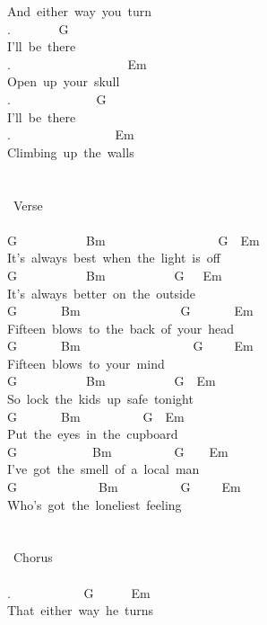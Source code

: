 {And\ either\ way\ you\ turn\\
. \ \ \ \ \ \ \ G\\
I'll\ be\ there\\
. \ \ \ \ \ \ \ \ \ \ \ \ \ \ \ \ \ \ Em\\
Open\ up\ your\ skull\\
. \ \ \ \ \ \ \ \ \ \ \ \ \ G\\
I'll\ be\ there\\
. \ \ \ \ \ \ \ \ \ \ \ \ \ \ \ \ Em\\
Climbing\ up\ the\ walls\\
\\
\\
\lbrack\ Verse\rbrack\\
\\
G\ \ \ \ \ \ \ \ \ \ \ Bm\ \ \ \ \ \ \ \ \ \ \ \ \ \ \ \ \ \ G\ \ Em\\
It's\ always\ best\ when\ the\ light\ is\ off\\
G\ \ \ \ \ \ \ \ \ \ \ Bm\ \ \ \ \ \ \ \ \ \ \ G\ \ \ Em\\
It's\ always\ better\ on\ the\ outside\\
G\ \ \ \ \ \ \ Bm\ \ \ \ \ \ \ \ \ \ \ \ \ \ \ \ G\ \ \ \ \ \ \ Em\\
Fifteen\ blows\ to\ the\ back\ of\ your\ head\\
G\ \ \ \ \ \ \ Bm\ \ \ \ \ \ \ \ \ \ \ \ \ \ \ \ \ \ G\ \ \ \ \ Em\\
Fifteen\ blows\ to\ your\ mind\\
G\ \ \ \ \ \ \ \ \ \ \ Bm\ \ \ \ \ \ \ \ \ \ \ G\ \ Em\\
So\ lock\ the\ kids\ up\ safe\ tonight\\
G\ \ \ \ \ \ \ Bm\ \ \ \ \ \ \ \ \ \ G\ \ Em\\
Put\ the\ eyes\ in\ the\ cupboard\\
G\ \ \ \ \ \ \ \ \ \ \ \ Bm\ \ \ \ \ \ \ \ \ \ G\ \ \ \ Em\\
I've\ got\ the\ smell\ of\ a\ local\ man\\
G\ \ \ \ \ \ \ \ \ \ \ \ \ Bm\ \ \ \ \ \ \ \ \ \ G\ \ \ \ \ Em\\
Who's\ got\ the\ loneliest\ feeling\\
\\
\\
\lbrack\ Chorus\rbrack\\
\\
. \ \ \ \ \ \ \ \ \ \ \ G\ \ \ \ \ \ Em\\
That\ either\ way\ he\ turns\\
}
